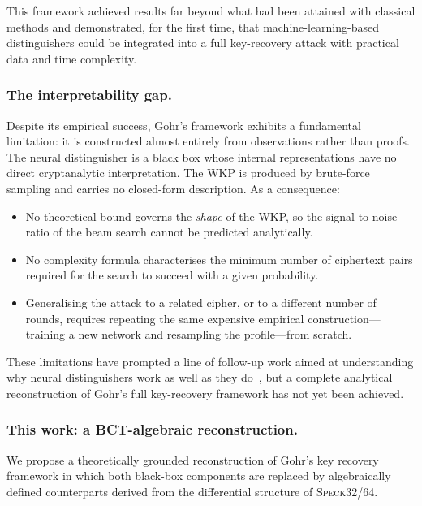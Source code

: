 \documentclass[runningheads]{llncs}
\newcommand{\speck}{\textsc{Speck}32/64}
\begin{document}
This framework achieved results far beyond what had been attained with
classical methods and demonstrated, for the first time, that
machine-learning-based distinguishers could be integrated into a full
key-recovery attack with practical data and time complexity.

\subsubsection{The interpretability gap.}
Despite its empirical success, Gohr's framework exhibits a fundamental
limitation: it is constructed almost entirely from observations rather
than proofs.  The neural distinguisher is a black box whose internal
representations have no direct cryptanalytic interpretation.  The WKP
is produced by brute-force sampling and carries no closed-form
description.  As a consequence:
\begin{itemize}
  \item No theoretical bound governs the \emph{shape} of the WKP, so
    the signal-to-noise ratio of the beam search cannot be predicted
    analytically.
  \item No complexity formula characterises the minimum number of
    ciphertext pairs required for the search to succeed with a given
    probability.
  \item Generalising the attack to a related cipher, or to a different
    number of rounds, requires repeating the same expensive empirical
    construction—training a new network and resampling the
    profile—from scratch.
\end{itemize}
These limitations have prompted a line of follow-up work aimed at
understanding why neural distinguishers work as well as they
do~\cite{BGMR23,BLY23,HWW23,LLLW22}, but a complete analytical
reconstruction of Gohr's full key-recovery framework has not yet been
achieved.

\subsubsection{This work: a BCT-algebraic reconstruction.}
We propose a theoretically grounded reconstruction of Gohr's key
recovery framework in which both black-box components are replaced by
algebraically defined counterparts derived from the differential
structure of \speck{}.
\end{document}

